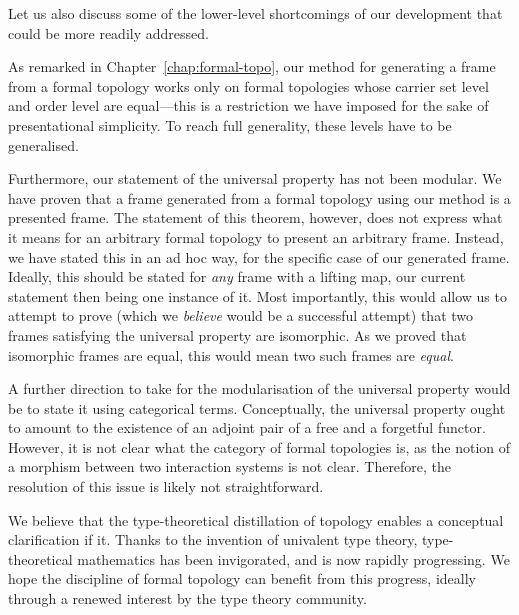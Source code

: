 Let us also discuss some of the lower-level shortcomings of our development that could be
more readily addressed.

As remarked in Chapter~\ref{chap:formal-topo}, our method for generating a frame from a
formal topology works only on formal topologies whose carrier set level and order level
are equal---this is a restriction we have imposed for the sake of presentational simplicity.
To reach full generality, these levels have to be generalised.

Furthermore, our statement of the universal property has not been modular. We have proven
that a frame generated from a formal topology using our method is a presented frame. The
statement of this theorem, however, does not express what it means for an arbitrary formal
topology to present an arbitrary frame. Instead, we have stated this in an ad hoc way, for
the specific case of our generated frame. Ideally, this should be stated for \emph{any}
frame with a lifting map, our current statement then being one instance of it. Most
importantly, this would allow us to attempt to prove (which we \emph{believe} would be a
successful attempt) that two frames satisfying the universal property are isomorphic. As
we proved that isomorphic frames are equal, this would mean two such frames are
\emph{equal}.

A further direction to take for the modularisation of the universal property would be to
state it using categorical terms. Conceptually, the universal property ought to amount to
the existence of an adjoint pair of a free and a forgetful functor. However, it is not
clear what the category of formal topologies is, as the notion of a morphism between two
interaction systems is not clear. Therefore, the resolution of this issue is likely not
straightforward.

We believe that the type-theoretical distillation of topology enables a conceptual
clarification if it. Thanks to the invention of univalent type theory, type-theoretical
mathematics has been invigorated, and is now rapidly progressing. We hope the discipline
of formal topology can benefit from this progress, ideally through a renewed interest by
the type theory community.

